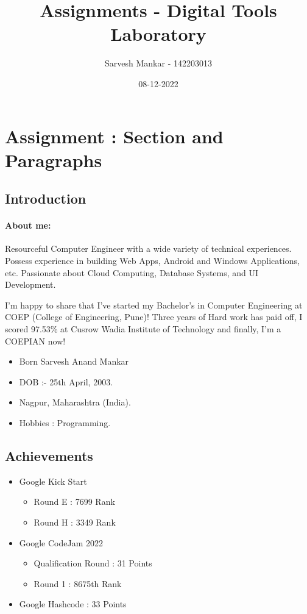 \documentclass{article}
\title{Assignments - Digital Tools Laboratory}
\date{08-12-2022}
\author{Sarvesh Mankar - 142203013}
\begin{document}
	\maketitle
	\newpage
	\tableofcontents
	
	\newpage
	
	\section{Assignment : Section and Paragraphs}
	
	\subsection{Introduction}
	\paragraph{About me:} 
Resourceful Computer Engineer with a wide variety of technical experiences. Possess experience in building Web Apps, Android and Windows Applications, etc. Passionate about Cloud Computing, Database Systems, and UI Development.

I'm happy to share that I've started my Bachelor's in Computer Engineering at COEP (College of Engineering, Pune)! Three years of Hard work has paid off, I scored 97.53\% at Cusrow Wadia Institute of Technology and finally, I'm a COEPIAN now! 


\begin{itemize}
	\item Born	Sarvesh Anand Mankar
	\item DOB :- 25th April, 2003.
	\item Nagpur, Maharashtra (India).
	\item Hobbies : Programming.
\end{itemize}	
	
	
	\subsection{Achievements}
	\begin{itemize}
		\item[] Google Kick Start
		\begin{itemize}
			\item Round E : 7699 Rank
			\item Round H : 3349 Rank
		\end{itemize}
		\item[] Google CodeJam 2022
		\begin{itemize}
			\item Qualification Round : 31 Points
			\item Round 1 : 8675th Rank
		\end{itemize}
		\item[] Google Hashcode : 33 Points
	\end{itemize}
	
\end{document}
